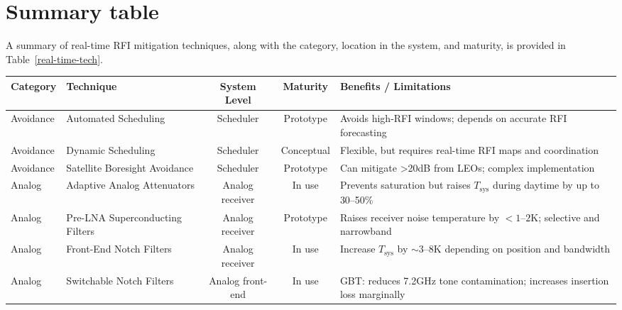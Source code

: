\section{Summary table} %
\label{section:hardware:summary}

A summary of real-time RFI mitigation techniques, along with the category, location in the system, and maturity, is provided in Table~\ref{real-time-tech}.

\begin{table*}[htbp]
  \begin{center}
  \caption{Summary of real-time RFI mitigation techniques. The maturity level distinguishes conceptual (i.e. theoretical), prototype (i.e. not yet deployed or under commissioning), implemented (i.e. deployed but optional), and in-use (i.e. in operation) techniques. The F-engine includes techniques in the time domain and those implemented post-channelization and pre-correlation. The last column summarizes known benefits or limitations when quantified.}
  \label{real-time-tech}
  \scriptsize
  \begin{tabular}{|l|l|c|c|p{5.7cm}|} \hline 
\textbf{Category} & \textbf{Technique} & \textbf{System Level} & \textbf{Maturity} & \textbf{Benefits / Limitations} \\ 
\hline
Avoidance & Automated Scheduling & Scheduler & Prototype & Avoids high-RFI windows; depends on accurate RFI forecasting \\ \hline
Avoidance & Dynamic Scheduling & Scheduler & Conceptual & Flexible, but requires real-time RFI maps and coordination \\ \hline
Avoidance & Satellite Boresight Avoidance & Scheduler & Prototype & Can mitigate >20dB from LEOs; complex implementation \\ \hline
Analog & Adaptive Analog Attenuators & Analog receiver & In use & Prevents saturation but raises $T_{\text{sys}}$ during daytime by up to 30–50\%  \\ \hline
Analog & Pre-LNA Superconducting Filters & Analog receiver & Prototype & Raises receiver noise temperature by $<1$–$2$K; selective and narrowband \\ \hline
Analog & Front-End Notch Filters & Analog receiver & In use & Increase $T_{\text{sys}}$ by $\sim$3–8K depending on position and bandwidth  \\ \hline
Analog & Switchable Notch Filters & Analog front-end & In use & GBT: reduces 7.2GHz tone contamination; increases insertion loss marginally \\ \hline

\end{tabular}
\end{center}
\end{table*}
